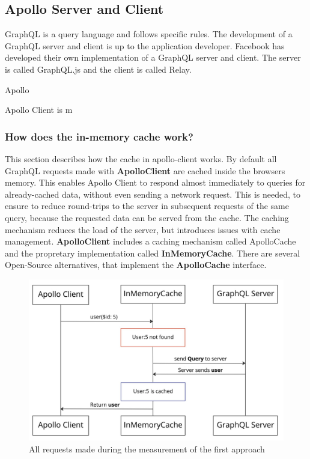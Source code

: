 \subsection{Apollo Server and Client}

GraphQL is a query language and follows specific rules. The development of a GraphQL server and client is up to the application developer. Facebook has developed their own implementation of a GraphQL server and client. The server is called GraphQL.js and the client is called Relay.

Apollo 

Apollo Client is m

\subsubsection{How does the in-memory cache work?}

This section describes how the cache in apollo-client works. By default all GraphQL requests made with \textbf{ApolloClient} are cached inside the browsers memory. This enables Apollo Client to respond almost immediately to queries for already-cached data, without even sending a network request. This is needed, to ensure to reduce round-trips to the server in subsequent requests of the same query, because the requested data can be served from the cache. The caching mechanism reduces the load of the server, but introduces issues with cache management. \textbf{ApolloClient} includes a caching mechanism called ApolloCache and the propretary implementation called \textbf{InMemoryCache}. There are several Open-Source alternatives, that implement the \textbf{ApolloCache} interface.

\ifshowImages
\begin{figure}[!htbp]
\centering
\includegraphics[width=0.6\linewidth]{images/background/apollo/apollo-client-basic-cache.jpeg}
\caption{All requests made during the measurement of the first approach}\label{figure:background:user-query-first-time}
\end{figure}
\fi

